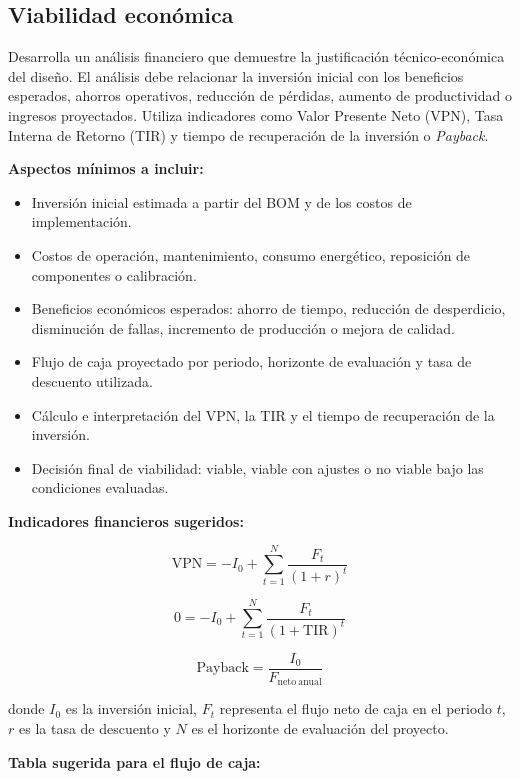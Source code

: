 \documentclass[12pt,letterpaper]{report}
\begin{document}
\subsection{Viabilidad económica}

\begin{instrucciones}
Desarrolla un análisis financiero que demuestre la justificación técnico-económica del diseño. El análisis debe relacionar la inversión inicial con los beneficios esperados, ahorros operativos, reducción de pérdidas, aumento de productividad o ingresos proyectados. Utiliza indicadores como Valor Presente Neto (VPN), Tasa Interna de Retorno (TIR) y tiempo de recuperación de la inversión o \textsl{Payback}.

\vspace{2mm}
\noindent \textbf{Aspectos mínimos a incluir:}
\begin{itemize}
  \item Inversión inicial estimada a partir del BOM y de los costos de implementación.
  \item Costos de operación, mantenimiento, consumo energético, reposición de componentes o calibración.
  \item Beneficios económicos esperados: ahorro de tiempo, reducción de desperdicio, disminución de fallas, incremento de producción o mejora de calidad.
  \item Flujo de caja proyectado por periodo, horizonte de evaluación y tasa de descuento utilizada.
  \item Cálculo e interpretación del VPN, la TIR y el tiempo de recuperación de la inversión.
  \item Decisión final de viabilidad: viable, viable con ajustes o no viable bajo las condiciones evaluadas.
\end{itemize}

\vspace{2mm}
\noindent \textbf{Indicadores financieros sugeridos:}

\[
\mathrm{VPN} = -I_0 + \sum_{t=1}^{N} \frac{F_t}{\left(1+r\right)^t}
\]

\[
0 = -I_0 + \sum_{t=1}^{N} \frac{F_t}{\left(1+\mathrm{TIR}\right)^t}
\]

\[
\mathrm{Payback} = \frac{I_0}{F_{\mathrm{neto\ anual}}}
\]

\noindent donde $I_0$ es la inversión inicial, $F_t$ representa el flujo neto de caja en el periodo $t$, $r$ es la tasa de descuento y $N$ es el horizonte de evaluación del proyecto.

\vspace{2mm}
\noindent \textbf{Tabla sugerida para el flujo de caja:}


\end{instrucciones}
\end{document}
